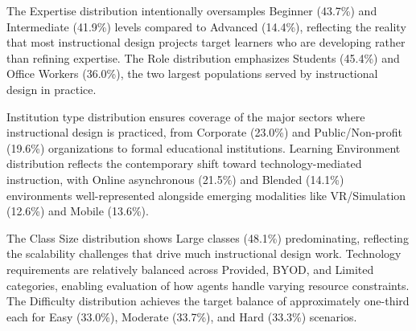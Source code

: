 The Expertise distribution intentionally oversamples Beginner (43.7\%) and Intermediate (41.9\%) levels compared to Advanced (14.4\%), reflecting the reality that most instructional design projects target learners who are developing rather than refining expertise. The Role distribution emphasizes Students (45.4\%) and Office Workers (36.0\%), the two largest populations served by instructional design in practice.

Institution type distribution ensures coverage of the major sectors where instructional design is practiced, from Corporate (23.0\%) and Public/Non-profit (19.6\%) organizations to formal educational institutions. Learning Environment distribution reflects the contemporary shift toward technology-mediated instruction, with Online asynchronous (21.5\%) and Blended (14.1\%) environments well-represented alongside emerging modalities like VR/Simulation (12.6\%) and Mobile (13.6\%).

The Class Size distribution shows Large classes (48.1\%) predominating, reflecting the scalability challenges that drive much instructional design work. Technology requirements are relatively balanced across Provided, BYOD, and Limited categories, enabling evaluation of how agents handle varying resource constraints. The Difficulty distribution achieves the target balance of approximately one-third each for Easy (33.0\%), Moderate (33.7\%), and Hard (33.3\%) scenarios.


